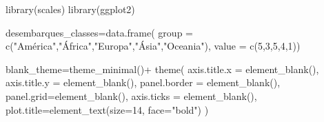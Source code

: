 \documentclass[
]{book}
\newenvironment{Shaded}{\begin{snugshade}}{\end{snugshade}}
\newcommand{\AttributeTok}[1]{\textcolor[rgb]{0.77,0.63,0.00}{#1}}
\newcommand{\DecValTok}[1]{\textcolor[rgb]{0.00,0.00,0.81}{#1}}
\newcommand{\FunctionTok}[1]{\textcolor[rgb]{0.00,0.00,0.00}{#1}}
\newcommand{\NormalTok}[1]{#1}
\newcommand{\OtherTok}[1]{\textcolor[rgb]{0.56,0.35,0.01}{#1}}
\newcommand{\SpecialCharTok}[1]{\textcolor[rgb]{0.00,0.00,0.00}{#1}}
\newcommand{\StringTok}[1]{\textcolor[rgb]{0.31,0.60,0.02}{#1}}
\begin{document}
\begin{Shaded}
\begin{Highlighting}[]
\FunctionTok{library}\NormalTok{(scales)}
\FunctionTok{library}\NormalTok{(ggplot2)}

\NormalTok{desembarques\_classes}\OtherTok{=}\FunctionTok{data.frame}\NormalTok{(}
  \AttributeTok{group =} \FunctionTok{c}\NormalTok{(}\StringTok{"América"}\NormalTok{,}\StringTok{"África"}\NormalTok{,}\StringTok{"Europa"}\NormalTok{,}\StringTok{"Ásia"}\NormalTok{,}\StringTok{"Oceania"}\NormalTok{),}
  \AttributeTok{value =} \FunctionTok{c}\NormalTok{(}\DecValTok{5}\NormalTok{,}\DecValTok{3}\NormalTok{,}\DecValTok{5}\NormalTok{,}\DecValTok{4}\NormalTok{,}\DecValTok{1}\NormalTok{))}


\NormalTok{blank\_theme}\OtherTok{=}\FunctionTok{theme\_minimal}\NormalTok{()}\SpecialCharTok{+}
  \FunctionTok{theme}\NormalTok{(}
    \AttributeTok{axis.title.x =} \FunctionTok{element\_blank}\NormalTok{(),}
    \AttributeTok{axis.title.y =} \FunctionTok{element\_blank}\NormalTok{(),}
    \AttributeTok{panel.border =} \FunctionTok{element\_blank}\NormalTok{(),}
    \AttributeTok{panel.grid=}\FunctionTok{element\_blank}\NormalTok{(),}
    \AttributeTok{axis.ticks =} \FunctionTok{element\_blank}\NormalTok{(),}
    \AttributeTok{plot.title=}\FunctionTok{element\_text}\NormalTok{(}\AttributeTok{size=}\DecValTok{14}\NormalTok{, }\AttributeTok{face=}\StringTok{"bold"}\NormalTok{)}
\NormalTok{  )}


\end{Highlighting}
\end{Shaded}
\end{document}
